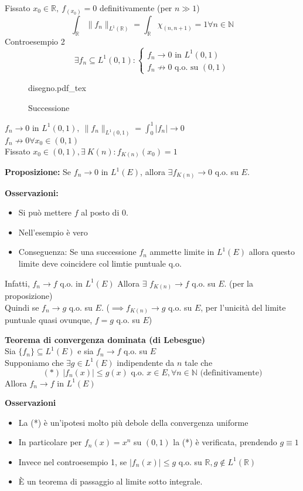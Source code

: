 \documentclass[a4paper]{article}
\newcommand{\incfig}[1]{%
	\def\svgwidth{\columnwidth}
	{#1.pdf_tex}
}
\newcommand{\R}{\mathbb{R}}
\newcommand{\N}{\mathbb{N}}
\begin{document}
Fissato $x_0\in\R,\ f_(x_0)=0$ definitivamente (per $n\gg 1$)
\[\int_{\R}^{} \|f_n\|_{L^1(\R)}=\int_{\R}^{} \chi_{(n,n+1)}=1 \forall n\in\N\]
Controesempio 2
\[\exists f_n \subseteq L^1(0,1): \begin{cases}
	f_n\to 0 \text{ in }L^1(0,1)\\
	f_n \not\to 0\text{ q.o. su }(0,1)
\end{cases} 
\]
\begin{figure}[ht]
    \centering
    \incfig{disegno}
    \caption{Successione}
    \label{fig:disegno}
\end{figure}
$f_n\to 0$ in $L^1(0,1), \ \|f_n\|_{L^1(0,1)}=\int_{0}^{1} |f_n|\to 0 $
\\$f_n\not\to 0\forall x_0\in(0,1)$
\\Fissato $x_0\in(0,1), \exists\  K(n):f_{K(n)}(x_0)=1$ 
\begin{tcolorbox}
	\textbf{Proposizione:} Se $f_n\to 0$ in $L^1(E)$, allora $\exists f_{K(n)}\to 0$ q.o. su $E$.
\end{tcolorbox}
\textbf{Osservazioni:} 
\begin{itemize}
	\item Si può mettere $f$ al posto di 0.
	\item Nell'esempio è vero
	\item Conseguenza: Se una successione $f_n$ ammette limite in $L^1(E)$ allora questo limite deve coincidere col limtie puntuale q.o. 
\end{itemize}
Infatti, $f_n\to f$ q.o. in $L^{1}(E)$
Allora $\exists $ $f_{K(n)}  \to f$ q.o. su $E$. (per la proposizione)
\\Quindi se $f_n\to g$ q.o. su $E$. ($\implies f_{K(n)}\to g$ q.o. su $E$, per l'unicità del limite puntuale quasi ovunque, $f=g$ q.o. su $E$)
\begin{tcolorbox}
	\textbf{Teorema di convergenza dominata (di Lebesgue)}
	\\Sia $\{f_n\} \subseteq  L^1(E)$ e sia $f_n\to f$ q.o. su $E$\\
	Supponiamo che $\exists g\in L^1(E)$ indipendente da $n$ tale che
	\[(*)\ |f_n(x)|\le g(x)\text{ q.o. }x\in E, \forall n \in \N\text{ (definitivamente)}\]
	Allora $f_n\to f$ in $L^1(E)$
\end{tcolorbox}
\textbf{Osservazioni}
\begin{itemize}
	\item La (*) è un'ipotesi molto più debole della convergenza uniforme
	\item In particolare per $f_n(x)=x^n$ su $(0,1)$ la (*) è verificata, prendendo $g\equiv 1$
	\item Invece nel controesempio 1, se $|f_n(x)|\le g$ q.o. su $\R,g \not\in L^1(\R)$
	\item È un teorema di passaggio al limite sotto integrale.
\end{itemize}
\end{document}
